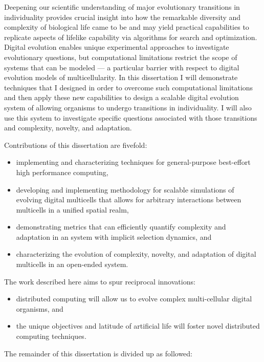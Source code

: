Deepening our scientific understanding of major evolutionary transitions in individuality provides crucial insight into how the remarkable diversity and complexity of biological life came to be and may yield practical capabilities to replicate aspects of lifelike capability via algorithms for search and optimization.
Digital evolution enables unique experimental approaches to investigate evolutionary questions, but computational limitations restrict the scope of systems that can be modeled --- a particular barrier with respect to digital evolution models of multicellularity.
In this dissertation I will demonstrate techniques that I designed in order to overcome such computational limitations and then apply these new capabilities to design a scalable digital evolution system of allowing organisms to undergo transitions in individuality.
I will also use this system to investigate specific questions associated with those transitions and complexity, novelty, and adaptation.

Contributions of this dissertation are fivefold:
\begin{itemize}
\item implementing and characterizing techniques for general-purpose best-effort high performance computing,
\item developing and implementing methodology for scalable simulations of evolving digital multicells that allows for arbitrary interactions between multicells in a unified spatial realm,
\item demonstrating metrics that can efficiently quantify complexity and adaptation in an system with implicit selection dynamics, and
\item characterizing the evolution of complexity, novelty, and adaptation of digital multicells in an open-ended system.
\end{itemize}

The work described here aims to spur reciprocal innovations:
\begin{itemize}
\item distributed computing will allow us to evolve complex multi-cellular digital organisms, and
\item the unique objectives and latitude of artificial life will foster novel distributed computing techniques.
\end{itemize}

The remainder of this dissertation is divided up as followed:

